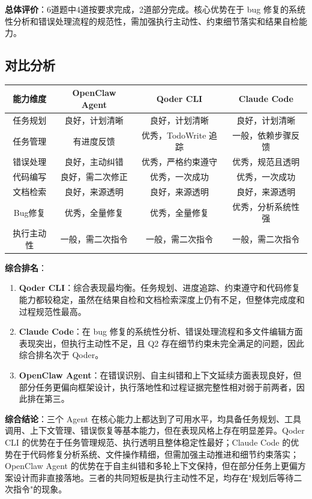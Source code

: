 \documentclass[a4paper]{article}
\begin{document}
\textbf{总体评价}：6道题中4道按要求完成，2道部分完成。核心优势在于 bug 修复的系统性分析和错误处理流程的规范性，需加强执行主动性、约束细节落实和结果自检能力。

\subsection{对比分析}

\begin{table}[H]
\centering
\begin{tabular}{|c|c|c|c|}
\hline
\textbf{能力维度} & \textbf{OpenClaw Agent} & \textbf{Qoder CLI} & \textbf{Claude Code} \\
\hline
任务规划 & 良好，计划清晰 & 良好，计划清晰 & 良好，计划清晰 \\
\hline 任务管理 & 有进度反馈 & 优秀，TodoWrite 追踪 & 一般，依赖步骤反馈 \\
\hline 错误处理 & 良好，主动纠错 & 优秀，严格约束遵守 & 优秀，规范且透明 \\
\hline 代码编写 & 良好，需二次修正 & 优秀，一次成功 & 优秀，一次成功 \\
\hline 文档检索 & 良好，来源透明 & 良好，来源透明 & 良好，来源透明 \\
\hline Bug修复 & 优秀，全量修复 & 优秀，全量修复 & 优秀，分析系统性强 \\
\hline 执行主动性 & 一般，需二次指令 & 一般，需二次指令 & 一般，需二次指令 \\
\hline
\end{tabular}
\end{table}

\textbf{综合排名}：
\begin{enumerate}
    \item \textbf{Qoder CLI}：综合表现最均衡。任务规划、进度追踪、约束遵守和代码修复能力都较稳定，虽然在结果自检和文档检索深度上仍有不足，但整体完成度和过程规范性最高。
    \item \textbf{Claude Code}：在 bug 修复的系统性分析、错误处理流程和多文件编辑方面表现突出，但执行主动性不足，且 Q2 存在细节约束未完全满足的问题，因此综合排名次于 Qoder。
    \item \textbf{OpenClaw Agent}：在错误识别、自主纠错和上下文延续方面表现良好，但部分任务更偏向框架设计，执行落地性和过程证据完整性相对弱于前两者，因此排在第三。
\end{enumerate}

\textbf{综合结论}：三个 Agent 在核心能力上都达到了可用水平，均具备任务规划、工具调用、上下文管理、错误恢复等基本能力，但在表现风格上存在明显差异。Qoder CLI 的优势在于任务管理规范、执行透明且整体稳定性最好；Claude Code 的优势在于代码修复分析系统、文件操作精细，但需加强主动推进和细节约束落实；OpenClaw Agent 的优势在于自主纠错和多轮上下文保持，但在部分任务上更偏方案设计而非直接落地。三者的共同短板是执行主动性不足，均存在"规划后等待二次指令"的现象。
\end{document}
